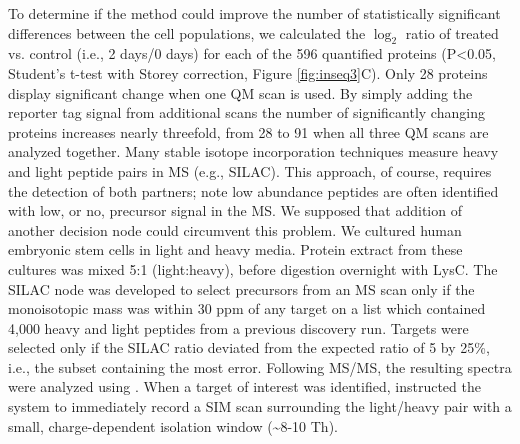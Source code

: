 To determine if the method could improve the number of statistically significant differences between the cell populations, we calculated the $\log_2$ ratio of treated vs. control (i.e., 2 days/0 days) for each of the 596 quantified proteins (P<0.05, Student's t-test with Storey correction, Figure \ref{fig:inseq3}C). Only 28 proteins display significant change when one QM scan is used. By simply adding the reporter tag signal from additional scans the number of significantly changing proteins increases nearly threefold, from 28 to 91 when all three QM scans are analyzed together.
Many stable isotope incorporation techniques measure heavy and light peptide pairs in MS (e.g., SILAC). This approach, of course, requires the detection of both partners; note low abundance peptides are often identified with low, or no, precursor signal in the MS. We supposed that addition of another \inseq{} decision node could circumvent this problem. We cultured human embryonic stem cells in light and heavy media. Protein extract from these cultures was mixed 5:1 (light:heavy), before digestion overnight with LysC. The SILAC node was developed to select precursors from an MS scan only if the monoisotopic mass was within 30 ppm of any target on a list which contained 4,000 heavy and light peptides from a previous discovery run. Targets were selected only if the SILAC ratio deviated from the expected ratio of 5 by 25\%, i.e., the subset containing the most error. Following MS/MS, the resulting spectra were analyzed using \inseq{}. When a target of interest was identified, \inseq{} instructed the system to immediately record a SIM scan surrounding the light/heavy pair with a small, charge-dependent isolation window (\textasciitilde8-10 Th).

